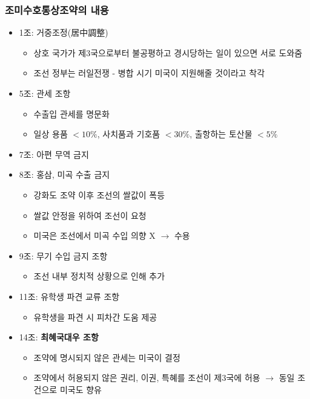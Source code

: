 \subsubsection*{조미수호통상조약의 내용}
\begin{itemize}
    \item 1조: 거중조정(居中調整)
    \begin{itemize}
        \item 상호 국가가 제3국으로부터 불공평하고 경시당하는 일이 있으면 서로 도와줌
        \item 조선 정부는 러일전쟁 - 병합 시기 미국이 지원해줄 것이라고 착각
    \end{itemize}
    \item 5조: 관세 조항
    \begin{itemize}
        \item 수출입 관세를 명문화
        \item 일상 용품 $<10\%$, 사치품과 기호품 $<30\%$, 출항하는 토산물 $<5\%$
    \end{itemize}
    \item 7조: 아편 무역 금지
    \item 8조: 홍삼, 미곡 수출 금지
    \begin{itemize}
        \item 강화도 조약 이후 조선의 쌀값이 폭등
        \item 쌀값 안정을 위하여 조선이 요청
        \item 미국은 조선에서 미곡 수입 의향 X $\rightarrow$ 수용
    \end{itemize}
    \item 9조: 무기 수입 금지 조항
    \begin{itemize}
        \item 조선 내부 정치적 상황으로 인해 추가
    \end{itemize}
    \item 11조: 유학생 파견 교류 조항
    \begin{itemize}
        \item 유학생을 파견 시 피차간 도움 제공
    \end{itemize}
    \item 14조: \textbf{최혜국대우 조항}
    \begin{itemize}
        \item 조약에 명시되지 않은 관세는 미국이 결정
        \item 조약에서 허용되지 않은 권리, 이권, 특혜를 조선이 제3국에 허용 $\rightarrow$ 동일 조건으로 미국도 향유
    \end{itemize}
\end{itemize}

